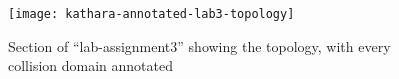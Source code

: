 \begin{figure}
  \centering
  \texttt{[image: kathara-annotated-lab3-topology]}
  \caption{Section of ``lab-assignment3'' showing the topology, with every collision domain annotated}
  \label{fig:kathara-annotated-lab3-topology}
\end{figure}
